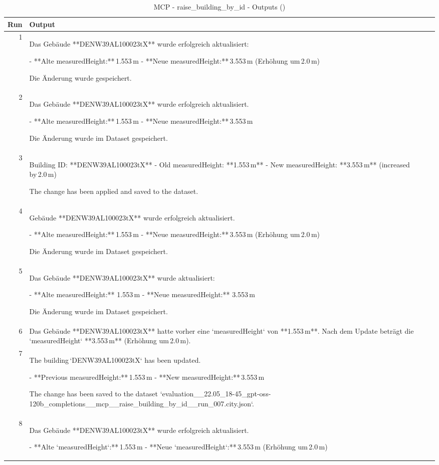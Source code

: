 \documentclass[a4paper,11pt]{article}
\begin{document}
\begin{table}[ht]
\centering
\scriptsize
\caption{MCP - raise\_building\_by\_id - Outputs ()}
\label{tab:mcp\_raise\_building\_by\_id\_outputs\_}
\begin{tabular}{r p{12cm}}
\hline
Run & Output \\
\hline
1 & Das Gebäude **DENW39AL100023tX** wurde erfolgreich aktualisiert:

- **Alte measuredHeight:** 1.553 m  
- **Neue measuredHeight:** 3.553 m (Erhöhung um 2.0 m)

Die Änderung wurde gespeichert. \\
2 & Das Gebäude **DENW39AL100023tX** wurde erfolgreich aktualisiert.

- **Alte measuredHeight:** 1.553 m  
- **Neue measuredHeight:** 3.553 m  

Die Änderung wurde im Dataset gespeichert. \\
3 & Building ID: **DENW39AL100023tX**  
- Old measuredHeight: **1.553 m**  
- New measuredHeight: **3.553 m** (increased by 2.0 m)  

The change has been applied and saved to the dataset. \\
4 & Gebäude **DENW39AL100023tX** wurde erfolgreich aktualisiert.  

- **Alte measuredHeight:** 1.553 m  
- **Neue measuredHeight:** 3.553 m (Erhöhung um 2.0 m)

Die Änderung wurde im Dataset gespeichert. \\
5 & Das Gebäude **DENW39AL100023tX** wurde aktualisiert:

- **Alte measuredHeight:** 1.553 m  
- **Neue measuredHeight:** 3.553 m  

Die Änderung wurde im Dataset gespeichert. \\
6 & Das Gebäude **DENW39AL100023tX** hatte vorher eine `measuredHeight` von **1.553 m**.  
Nach dem Update beträgt die `measuredHeight` **3.553 m** (Erhöhung um 2.0 m). \\
7 & The building `DENW39AL100023tX` has been updated.

- **Previous measuredHeight:** 1.553 m  
- **New measuredHeight:** 3.553 m  

The change has been saved to the dataset `evaluation\_\_22.05\_18-45\_gpt-oss-120b\_completions\_\_mcp\_\_raise\_building\_by\_id\_\_run\_007.city.json`. \\
8 & Das Gebäude **DENW39AL100023tX** wurde erfolgreich aktualisiert.

- **Alte `measuredHeight`:** 1.553 m  
- **Neue `measuredHeight`:** 3.553 m (Erhöhung um 2.0 m)


\end{tabular}
\end{table}
\end{document}
